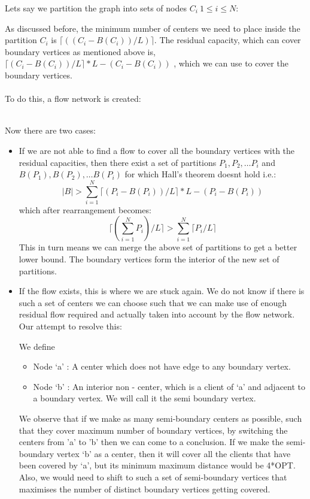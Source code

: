 \documentclass[12pt,a4paper,onecolumn]{article}
\begin{document}
Lets say we partition the graph into sets of nodes $C_i \: 1 \leq i \leq N$:
\begin{figure}
\end{figure}
As discussed before, the minimum number of centers we need to place inside the partition $C_i$ is $\lceil ((C_i-B(C_i))/L) \rceil$. The residual capacity, which can cover boundary vertices as mentioned above is,$\lceil (C_i-B(C_i))/L\rceil*L-(C_i-B(C_i))$ , which we can use to cover the boundary vertices. 
\\\\
To do this, a flow network is created:
\begin{figure}
\end{figure}\\
Now there are two cases:
\begin{itemize}
\item If we are not able to find a flow to cover all the boundary vertices with the residual capacities, then there exist a set of partitions $P_1, P_2,\ldots P_i$ and $B(P_1), B(P_2),\ldots B(P_i)$ for which Hall’s theorem doesnt hold i.e.: 
 $$|B|> {\sum_{i=1}^{N}\lceil (P_i-B(P_i))/L\rceil*L-(P_i-B(P_i))}$$
which after rearrangement becomes:\\
$$\lceil (\sum_{i=1}^{N}P_i)/L \rceil > \sum_{i=1}^{N} \lceil P_i/L \rceil   $$
This in turn means we can merge the above set of partitions to get a better lower bound. The boundary vertices form the interior of the new set of partitions. 
\item If the flow exists, this is where we are stuck again. We do not know if there is such a set of centers we can choose such that we can make use of enough residual flow required and actually taken into account by the flow network. 
Our attempt to resolve this:
\begin{figure}
\end{figure}
We define
\begin{itemize}


\item Node ‘a’ : A center which does not have edge to any boundary vertex.
\item Node ‘b’ : An interior non - center, which is a client of ‘a’ and adjacent to a boundary vertex. We will call it the semi boundary vertex. 
\end{itemize} 
We observe that if we make as many semi-boundary centers as possible, such that they cover maximum number of boundary vertices, by switching the centers from 'a' to 'b' then we can come to a conclusion. 
If we make the semi-boundary vertex ‘b’ as a center, then it will cover all the clients that have been covered by ‘a’, but its minimum maximum distance would be 4*OPT. Also, we would need to shift to such a set of semi-boundary vertices that maximises the number of distinct boundary vertices getting covered. 


\end{itemize}
\end{document}

